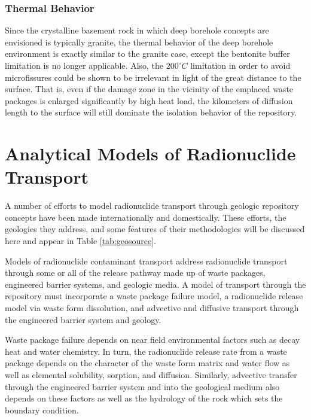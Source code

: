 \subsubsection{Thermal Behavior}
\label{subsec:boreholethermal}

Since the crystalline basement rock in which deep borehole concepts are 
envisioned is typically granite, the thermal behavior of the deep borehole 
environment is exactly similar to the granite case, except the bentonite buffer 
limitation is no longer applicable.  Also, the $200^{\circ}C$ limitation in 
order to avoid microfissures could  be shown to be irrelevant in light of the 
great distance to the surface. That is, even if the damage zone in the vicinity 
of the emplaced waste packages is enlarged significantly by high heat load, 
the kilometers of diffusion length to the surface will still dominate the 
isolation behavior of the repository. 



\section{Analytical Models of Radionuclide Transport} \label{sec:analytical_nuc}


A number of efforts to model radionuclide transport through geologic repository 
concepts have been made internationally and domestically. These efforts, the 
geologies they address, and  some features of their methodologies will be 
discussed here and appear in Table \ref{tab:geosource}.



Models of radionuclide contaminant transport address radionuclide transport 
through some or all of the release pathway made up of waste packages, 
engineered barrier systems, and geologic media. A model of transport through 
the repository must incorporate a waste package failure model, a radionuclide 
release model via waste form dissolution, and advective and diffusive transport 
through the engineered barrier system and geology. 

Waste package failure depends on near field environmental factors such as decay 
heat and water chemistry.  In turn, the radionuclide release rate from a waste 
package depends on the character of the waste form matrix and water flow as 
well as elemental solubility, sorption, and diffusion.  Similarly, advective 
transfer through the engineered barrier system and into the geological medium 
also depends on these factors as well as the hydrology of the rock which sets 
the boundary condition.

